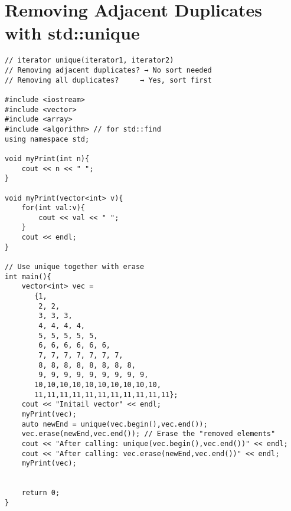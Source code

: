 \documentclass[12pt]{article}
\begin{document}
\section*{Removing Adjacent Duplicates with std::unique}
\begin{verbatim}
// iterator unique(iterator1, iterator2)
// Removing adjacent duplicates? → No sort needed
// Removing all duplicates?     → Yes, sort first

#include <iostream>
#include <vector>
#include <array>
#include <algorithm> // for std::find
using namespace std;

void myPrint(int n){
    cout << n << " ";
}

void myPrint(vector<int> v){
    for(int val:v){
        cout << val << " ";
    }
    cout << endl;
}

// Use unique together with erase
int main(){
    vector<int> vec = 
       {1, 
        2, 2, 
        3, 3, 3, 
        4, 4, 4, 4, 
        5, 5, 5, 5, 5, 
        6, 6, 6, 6, 6, 6, 
        7, 7, 7, 7, 7, 7, 7, 
        8, 8, 8, 8, 8, 8, 8, 8, 
        9, 9, 9, 9, 9, 9, 9, 9, 9, 
       10,10,10,10,10,10,10,10,10,10,
       11,11,11,11,11,11,11,11,11,11,11};
    cout << "Initail vector" << endl;
    myPrint(vec);
    auto newEnd = unique(vec.begin(),vec.end());
    vec.erase(newEnd,vec.end()); // Erase the "removed elements"
    cout << "After calling: unique(vec.begin(),vec.end())" << endl;
    cout << "After calling: vec.erase(newEnd,vec.end())" << endl;
    myPrint(vec);

    
    return 0;
}
\end{verbatim}
\end{document}
